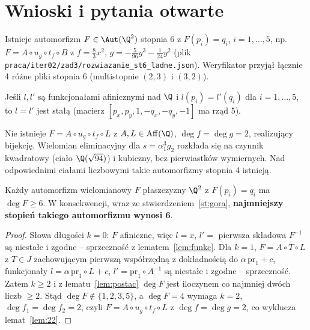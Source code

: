 \section{Wnioski i pytania otwarte}

\begin{stwierdzenie}[ZWERYFIKOWANE]\label{st:gora}
Istnieje automorfizm $F\in\Aut(\Q^2)$ stopnia $6$ z $F(p_i)=q_i$, $i=1,\dots,5$, np.
$F=A\circ u_g\circ t_f\circ B$ z $f=\tfrac83x^2$, $g=-\tfrac5{96}y^3-\tfrac1{24}y^2$
(plik \texttt{praca/iter02/zad3/rozwiazanie\_st6\_ladne.json}). Weryfikator przyjął
łącznie 4 różne pliki stopnia 6 (multistopnie $(2,3)$ i $(3,2)$).
\end{stwierdzenie}

\begin{lemat}\label{lem:funkc}
Jeśli $l,l'$ są funkcjonałami afinicznymi nad $\Q$ i $l(p_i)=l'(q_i)$ dla $i=1,\dots,5$, to
$l=l'$ jest stałą (macierz $[p_x,p_y,1,-q_x,-q_y,-1]$ ma rząd 5).
\end{lemat}

\begin{lemat}\label{lem:22}
Nie istnieje $F=A\circ u_g\circ t_f\circ L$ z $A,L\in\mathrm{Aff}(\Q)$, $\deg f=\deg g=2$,
realizujący bijekcję. Wielomian eliminacyjny dla $s=\alpha_1^3g_2$ rozkłada się na czynnik
kwadratowy (ciało $\Q(\sqrt{94})$) i kubiczny, bez pierwiastków wymiernych. Nad odpowiednimi
ciałami liczbowymi takie automorfizmy stopnia 4 istnieją.
\end{lemat}

\begin{twierdzenie}\label{tw:dol}
Każdy automorfizm wielomianowy $F$ płaszczyzny $\Q^2$ z $F(p_i)=q_i$ ma $\deg F\ge6$.
W konsekwencji, wraz ze stwierdzeniem~\ref{st:gora}, \textbf{najmniejszy stopień takiego
automorfizmu wynosi 6}.
\end{twierdzenie}
\begin{proof}
Słowa długości $k=0$: $F$ afiniczne, więc $l=x$, $l'=$ pierwsza składowa $F^{-1}$ są niestałe
i zgodne -- sprzeczność z lematem~\ref{lem:funkc}. Dla $k=1$, $F=A\circ T\circ L$ z $T\in J$
zachowującym pierwszą współrzędną z dokładnością do $\alpha\,\mathrm{pr}_1+c$, funkcjonały
$l=\alpha\,\mathrm{pr}_1\circ L+c$, $l'=\mathrm{pr}_1\circ A^{-1}$ są niestałe i zgodne --
sprzeczność. Zatem $k\ge2$ i z lematu~\ref{lem:postac} $\deg F$ jest iloczynem co najmniej dwóch
liczb $\ge2$. Stąd $\deg F\notin\{1,2,3,5\}$, a $\deg F=4$ wymaga $k=2$, $\deg f_1=\deg f_2=2$,
czyli $F=A\circ u_g\circ t_f\circ L$ z $\deg f=\deg g=2$, co wyklucza lemat~\ref{lem:22}.
\end{proof}

